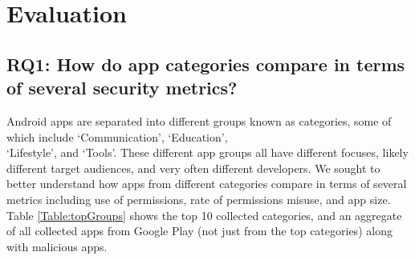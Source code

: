 \documentclass{sig-alternate-05-2015}
\begin{document}
\section{Evaluation}
\label{sec: evaluation}


\subsection{RQ1: How do app categories compare in terms of several security metrics?}

Android apps are separated into different groups known as categories, some of which include `Communication', `Education', \\ `Lifestyle', and `Tools'. These different app groups all have different focuses, likely different target audiences, and very often different developers. We sought to better understand how apps from different categories compare in terms of several metrics including use of permissions, rate of permissions misuse, and app size. Table \ref{Table:topGroups} shows the top 10 collected categories, and an aggregate of all collected apps from Google Play (not just from the top categories) along with malicious apps.

\end{document}
